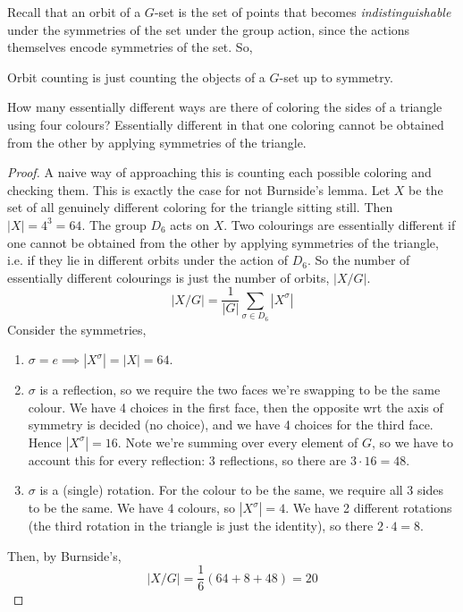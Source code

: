 Recall that an orbit of a $G$-set is the set of points that becomes
\emph{indistinguishable} under the symmetries of the set under the group action, since the
actions themselves encode symmetries of the set. So,
\begin{remark}
  Orbit counting is just counting the objects of a $G$-set up to symmetry.
\end{remark}
\begin{example}
  How many essentially different ways are there of coloring the sides of a triangle using
  four colours?  Essentially different in that one coloring cannot be obtained from the
  other by applying symmetries of the triangle.
\end{example}
\begin{proof}
  A naive way of approaching this is counting each possible coloring and checking them.
  This is exactly the case for not Burnside's lemma. Let $X$ be the set of all genuinely
  different coloring for the triangle sitting still. Then $|X|=4^3=64$. The group $D_6$
  acts on $X$. Two colourings are essentially different if one cannot be obtained from the
  other by applying symmetries of the triangle, i.e. if they lie in different orbits under
  the action of $D_6$. So the number of essentially different colourings is just the
  number of orbits, $|X/G|$.
  \[|X/G|=\frac{1}{|G|}\sum_{\sigma\in D_6}|X^{\sigma}|\]
  Consider the symmetries,
  \begin{enumerate}
    \item $\sigma=e\implies |X^{\sigma}|=|X|=64$.
    \item $\sigma$ is a reflection, so we require the two faces we're swapping to be the
      same colour. We have 4 choices in the first face, then the opposite wrt the axis of
      symmetry is decided (no choice), and we have 4 choices for the third face. Hence
      $|X^{\sigma}|=16$. Note we're summing over every element of $G$, so we have to
      account this for every reflection: 3 reflections, so there are $3\cdot 16=48$.
    \item $\sigma$ is a (single) rotation. For the colour to be the same, we require all 3 sides to
      be the same. We have $4$ colours, so $|X^{\sigma}|=4$. We have 2 different rotations
      (the third rotation in the triangle is just the identity), so there $2\cdot 4= 8$.
  \end{enumerate}
  Then, by Burnside's,
  \[|X/G|=\frac{1}{6}(64+8+48) = 20\]
\end{proof}
